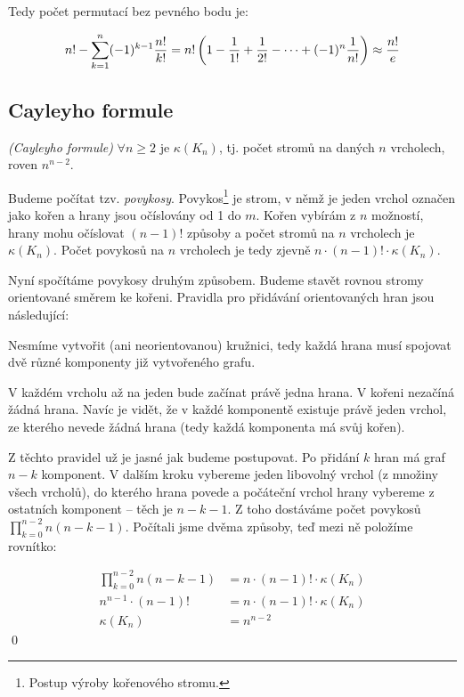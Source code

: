 Tedy počet permutací bez pevného bodu je:

$$n! - \sum_{k=1}^n (-1)^{k-1}{n!\over k!} = n!\left( 1-{1\over 1!}+{1\over
2!}-\cdots +(-1)^n{1\over n!} \right) \approx {n!\over e}$$


\subsection{Cayleyho formule}

\vt \emph{(Cayleyho formule)} $\forall n\ge 2$ je $\kappa(K_n)$, tj. počet
stromů na daných $n$ vrcholech, roven $n^{n-2}$.

\dk Budeme počítat tzv. \emph{povykosy}. Povykos\footnote{Postup výroby kořenového
stromu.} je strom, v němž je jeden vrchol označen jako kořen a hrany jsou
očíslovány od 1 do $m$. Kořen vybírám z $n$ možností, hrany mohu očíslovat
$(n-1)!$ způsoby a počet stromů na $n$ vrcholech je $\kappa(K_n)$. Počet
povykosů na $n$ vrcholech je tedy zjevně $n\cdot(n-1)!\cdot\kappa(K_n)$.

Nyní spočítáme povykosy druhým způsobem. Budeme stavět rovnou stromy orientované
směrem ke kořeni. Pravidla pro přidávání orientovaných hran jsou následující:
\begin{enumerate*}
\item Nesmíme vytvořit (ani neorientovanou) kružnici, tedy každá hrana musí
spojovat dvě různé komponenty již vytvořeného grafu.
\item V každém vrcholu až na jeden bude začínat právě jedna hrana. V kořeni
nezačíná žádná hrana. Navíc je vidět, že v každé komponentě existuje právě jeden
vrchol, ze kterého nevede žádná hrana (tedy každá komponenta má svůj kořen).
\end{enumerate*}
Z těchto pravidel už je jasné jak budeme postupovat. Po přidání $k$ hran má graf
$n-k$ komponent. V dalším kroku vybereme jeden libovolný vrchol (z množiny všech
vrcholů), do kterého hrana povede a počáteční vrchol hrany vybereme z ostatních
komponent -- těch je $n-k-1$. Z toho dostáváme počet povykosů $\prod_{k=0}^{n-2}
n(n-k-1)$. Počítali jsme dvěma způsoby, teď mezi ně položíme rovnítko:

\begin{align*}
\prod_{k=0}^{n-2} n(n-k-1) &= n\cdot(n-1)!\cdot\kappa(K_n) \\
n^{n-1}\cdot (n-1)! &= n\cdot(n-1)!\cdot\kappa(K_n) \\
\kappa(K_n) &= n^{n-2}
\end{align*}
\qed

